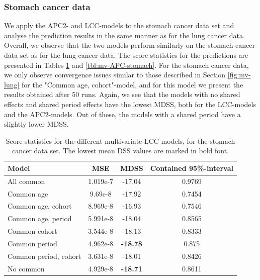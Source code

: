 \newpage
\subsubsection{Stomach cancer data}
We apply the APC2- and LCC-models to the stomach cancer data set and analyse the prediction results in the same manner as for the lung cancer data. Overall, we observe that the two models perform similarly on the stomach cancer data set as for the lung cancer data. The score statistics for the predictions are presented in Tables \ref{tbl:mv-LCC-stomach} and \ref{tbl:mv-APC-stomach}. For the stomach cancer data, we only observe convergence issues similar to those described in Section \ref{fig:mv-lung} for the "Common age, cohort"-model, and for this model we present the results obtained after 50 runs. Again, we see that the models with no shared effects and shared period effects have the lowest MDSS, both for the LCC-models and the APC2-models. Out of these, the models with a shared period have a slightly lower MDSS.  

\begin{table}
    \begin{center}
        \begin{tabular}{l |c c c }
            Model & MSE & MDSS & Contained 95\%-interval\\
            \hline
            All common            & 1.019e-7  & -17.04    & 0.9769 \\
            Common age            &  9.69e-8 & -17.92    & 0.7454 \\
            Common age, cohort    & 8.969e-8 & -16.93    & 0.7546 \\
            Common age, period    & 5.991e-8 & -18.04    & 0.8565 \\
            Common cohort         &  3.544e-8 & -18.13   & 0.8333 \\
            Common period         &  4.962e-8 & \textbf{-18.78}   & 0.875  \\
            Common period, cohort & 3.631e-8 & -18.01    & 0.8426 \\
            No common            &  4.929e-8 & \textbf{-18.71}    & 0.8611 \\
        \end{tabular}
        \caption{Score statistics for the different multivariate LCC models, for the stomach cancer data set. The lowest mean DSS values are marked in bold font. }\label{tbl:mv-LCC-stomach}
    \end{center}
\end{table}

